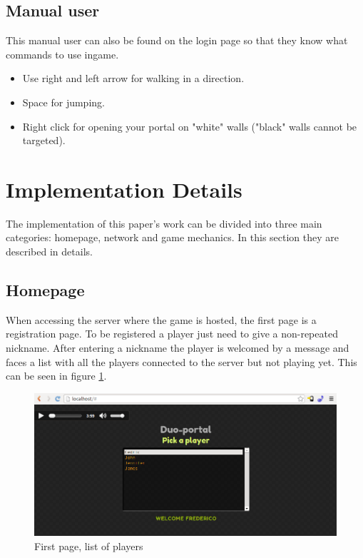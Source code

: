 \documentclass{chi-ext}
\begin{document}
\subsection{Manual user}
This manual user can also be found on the login page so that they know what commands to use ingame.
\begin{itemize}
\item Use right and left arrow for walking in a direction.
\item Space for jumping.
\item Right click for opening your portal on "white" walls ("black" walls cannot be targeted).
\end{itemize}

\section{Implementation Details}
The implementation of this paper's work can be divided into three main categories: homepage, network and game mechanics. In this section they are described in details.

\subsection{Homepage}
When accessing the server where the game is hosted, the first page is a registration page. To be registered a player just need to give a non-repeated nickname. After entering a nickname the player is welcomed by a message and faces a list with all the players connected to the server but not playing yet. This can be seen in figure \ref{fig:index}. 

\begin{figure}
\hspace*{-0.1\columnwidth}%
\parbox{1.4\columnwidth}{
  \centering
  \includegraphics[width=1.4\columnwidth]{index.png}
  \caption{First page, list of players}
  \label{fig:index}
}
\end{figure}
\end{document}
